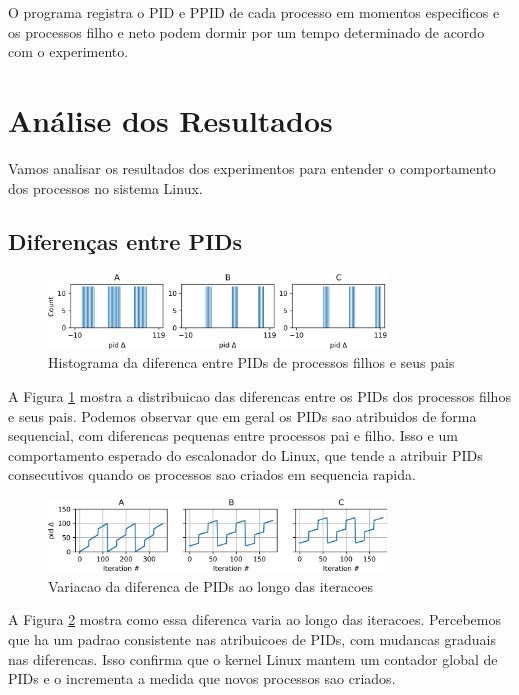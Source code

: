 \documentclass[12pt]{article}
\begin{document}
O programa registra o PID e PPID de cada processo em momentos especificos e os processos filho e neto podem dormir por um tempo determinado de acordo com o experimento.

\section{Análise dos Resultados}

Vamos analisar os resultados dos experimentos para entender o comportamento dos processos no sistema Linux.

\subsection{Diferenças entre PIDs}

\begin{figure}[h]
    \centering
    \includegraphics[width=0.8\textwidth]{figures/delta_histogram.png}
    \caption{Histograma da diferenca entre PIDs de processos filhos e seus pais}
    \label{fig:delta_histogram}
\end{figure}

A Figura \ref{fig:delta_histogram} mostra a distribuicao das diferencas entre os PIDs dos processos filhos e seus pais. Podemos observar que em geral os PIDs sao atribuidos de forma sequencial, com diferencas pequenas entre processos pai e filho. Isso e um comportamento esperado do escalonador do Linux, que tende a atribuir PIDs consecutivos quando os processos sao criados em sequencia rapida.

\begin{figure}[h]
    \centering
    \includegraphics[width=0.8\textwidth]{figures/delta_iteration.png}
    \caption{Variacao da diferenca de PIDs ao longo das iteracoes}
    \label{fig:delta_iteration}
\end{figure}

A Figura \ref{fig:delta_iteration} mostra como essa diferenca varia ao longo das iteracoes. Percebemos que ha um padrao consistente nas atribuicoes de PIDs, com mudancas graduais nas diferencas. Isso confirma que o kernel Linux mantem um contador global de PIDs e o incrementa a medida que novos processos sao criados.
\end{document}
